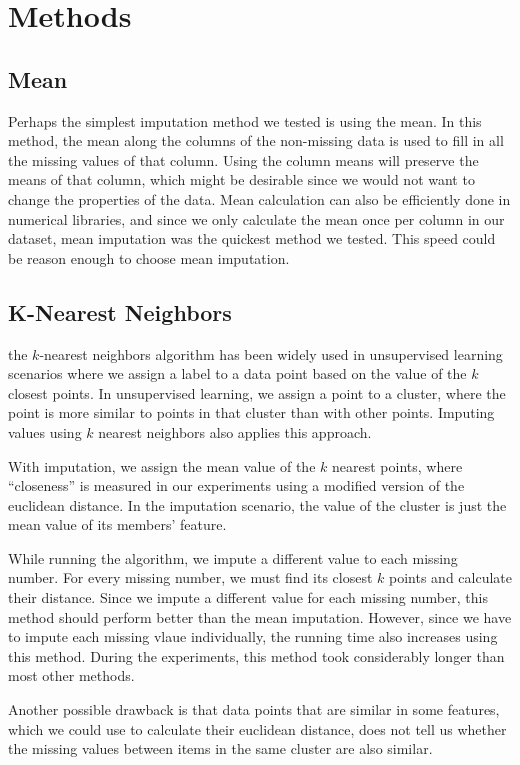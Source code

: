 \documentclass[12pt]{article}
\begin{document}
\section{Methods}
\subsection{Mean}
Perhaps the simplest imputation method we tested is using the mean.
In this method, the mean along the columns of the non-missing data
is used to fill in all the missing values of that column.
Using the column means will preserve the means of that column,
which might be desirable since we would not want to change the 
properties of the data.
Mean calculation can also be efficiently done in numerical libraries, 
and since we only calculate the mean once per column in our dataset, 
mean imputation was the quickest method we tested.
This speed could be reason enough to choose mean imputation.

\subsection{K-Nearest Neighbors}
the $k$-nearest neighbors algorithm has been widely used in unsupervised
learning scenarios where we assign a label to a data point based on the
value of the $k$ closest points.
In unsupervised learning, we assign a point to a cluster, where the 
point is more similar to points in that cluster than with other points.
Imputing values using $k$ nearest neighbors also applies this approach.

With imputation, we assign the mean value of the $k$ nearest points,
where ``closeness'' is measured in our experiments using a modified
version of the euclidean distance.
In the imputation scenario, the value of the cluster is just the 
mean value of its members' feature.

While running the algorithm, we impute a different value to 
each missing number.
For every missing number, we must find its closest $k$ points
and calculate their distance.
Since we impute a different value for each missing number, this 
method should perform better than the mean imputation.
However, since we have to impute each missing vlaue individually,
the running time also increases using this method.
During the experiments, this method took considerably longer than 
most other methods.

Another possible drawback is that data points that are similar
in some features, which we could use to calculate their euclidean
distance, does not tell us whether the missing values between items
in the same cluster are also similar.
\end{document}

